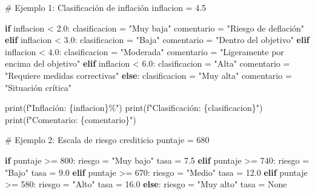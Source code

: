 \documentclass[
  doc,
  floatsintext,
  longtable,
  a4paper,
  nolmodern,
  notxfonts,
  notimes,
  12pt,
  colorlinks=true,linkcolor=blue,citecolor=blue,urlcolor=blue]{apa7}
\newenvironment{Shaded}{\begin{snugshade}}{\end{snugshade}}
\newcommand{\BuiltInTok}[1]{\textcolor[rgb]{0.00,0.23,0.31}{#1}}
\newcommand{\CommentTok}[1]{\textcolor[rgb]{0.37,0.37,0.37}{#1}}
\newcommand{\ControlFlowTok}[1]{\textcolor[rgb]{0.00,0.23,0.31}{\textbf{#1}}}
\newcommand{\DecValTok}[1]{\textcolor[rgb]{0.68,0.00,0.00}{#1}}
\newcommand{\FloatTok}[1]{\textcolor[rgb]{0.68,0.00,0.00}{#1}}
\newcommand{\NormalTok}[1]{\textcolor[rgb]{0.00,0.23,0.31}{#1}}
\newcommand{\OperatorTok}[1]{\textcolor[rgb]{0.37,0.37,0.37}{#1}}
\newcommand{\SpecialCharTok}[1]{\textcolor[rgb]{0.37,0.37,0.37}{#1}}
\newcommand{\SpecialStringTok}[1]{\textcolor[rgb]{0.13,0.47,0.30}{#1}}
\newcommand{\StringTok}[1]{\textcolor[rgb]{0.13,0.47,0.30}{#1}}
\newcommand{\VariableTok}[1]{\textcolor[rgb]{0.07,0.07,0.07}{#1}}
\begin{document}
\begin{Shaded}
\begin{Highlighting}[]
\CommentTok{\# Ejemplo 1: Clasificación de inflación}
\NormalTok{inflacion }\OperatorTok{=} \FloatTok{4.5}

\ControlFlowTok{if}\NormalTok{ inflacion }\OperatorTok{\textless{}} \FloatTok{2.0}\NormalTok{:}
\NormalTok{    clasificacion }\OperatorTok{=} \StringTok{"Muy baja"}
\NormalTok{    comentario }\OperatorTok{=} \StringTok{"Riesgo de deflación"}
\ControlFlowTok{elif}\NormalTok{ inflacion }\OperatorTok{\textless{}} \FloatTok{3.0}\NormalTok{:}
\NormalTok{    clasificacion }\OperatorTok{=} \StringTok{"Baja"}
\NormalTok{    comentario }\OperatorTok{=} \StringTok{"Dentro del objetivo"}
\ControlFlowTok{elif}\NormalTok{ inflacion }\OperatorTok{\textless{}} \FloatTok{4.0}\NormalTok{:}
\NormalTok{    clasificacion }\OperatorTok{=} \StringTok{"Moderada"}
\NormalTok{    comentario }\OperatorTok{=} \StringTok{"Ligeramente por encima del objetivo"}
\ControlFlowTok{elif}\NormalTok{ inflacion }\OperatorTok{\textless{}} \FloatTok{6.0}\NormalTok{:}
\NormalTok{    clasificacion }\OperatorTok{=} \StringTok{"Alta"}
\NormalTok{    comentario }\OperatorTok{=} \StringTok{"Requiere medidas correctivas"}
\ControlFlowTok{else}\NormalTok{:}
\NormalTok{    clasificacion }\OperatorTok{=} \StringTok{"Muy alta"}
\NormalTok{    comentario }\OperatorTok{=} \StringTok{"Situación crítica"}

\BuiltInTok{print}\NormalTok{(}\SpecialStringTok{f"Inflación: }\SpecialCharTok{\{}\NormalTok{inflacion}\SpecialCharTok{\}}\SpecialStringTok{\%"}\NormalTok{)}
\BuiltInTok{print}\NormalTok{(}\SpecialStringTok{f"Clasificación: }\SpecialCharTok{\{}\NormalTok{clasificacion}\SpecialCharTok{\}}\SpecialStringTok{"}\NormalTok{)}
\BuiltInTok{print}\NormalTok{(}\SpecialStringTok{f"Comentario: }\SpecialCharTok{\{}\NormalTok{comentario}\SpecialCharTok{\}}\SpecialStringTok{"}\NormalTok{)}

\CommentTok{\# Ejemplo 2: Escala de riesgo crediticio}
\NormalTok{puntaje }\OperatorTok{=} \DecValTok{680}

\ControlFlowTok{if}\NormalTok{ puntaje }\OperatorTok{\textgreater{}=} \DecValTok{800}\NormalTok{:}
\NormalTok{    riesgo }\OperatorTok{=} \StringTok{"Muy bajo"}
\NormalTok{    tasa }\OperatorTok{=} \FloatTok{7.5}
\ControlFlowTok{elif}\NormalTok{ puntaje }\OperatorTok{\textgreater{}=} \DecValTok{740}\NormalTok{:}
\NormalTok{    riesgo }\OperatorTok{=} \StringTok{"Bajo"}
\NormalTok{    tasa }\OperatorTok{=} \FloatTok{9.0}
\ControlFlowTok{elif}\NormalTok{ puntaje }\OperatorTok{\textgreater{}=} \DecValTok{670}\NormalTok{:}
\NormalTok{    riesgo }\OperatorTok{=} \StringTok{"Medio"}
\NormalTok{    tasa }\OperatorTok{=} \FloatTok{12.0}
\ControlFlowTok{elif}\NormalTok{ puntaje }\OperatorTok{\textgreater{}=} \DecValTok{580}\NormalTok{:}
\NormalTok{    riesgo }\OperatorTok{=} \StringTok{"Alto"}
\NormalTok{    tasa }\OperatorTok{=} \FloatTok{16.0}
\ControlFlowTok{else}\NormalTok{:}
\NormalTok{    riesgo }\OperatorTok{=} \StringTok{"Muy alto"}
\NormalTok{    tasa }\OperatorTok{=} \VariableTok{None}


\end{Highlighting}
\end{Shaded}
\end{document}

